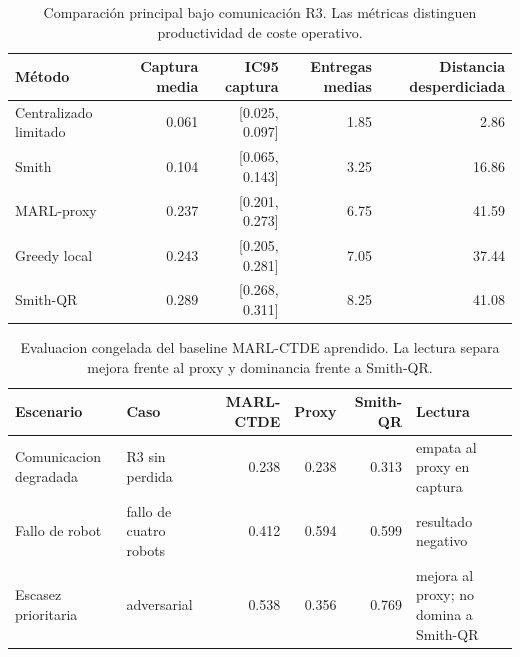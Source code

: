 \begin{table}[H]
\centering
\caption{Comparación principal bajo comunicación R3. Las métricas distinguen productividad de coste operativo.}
\label{tab:validation-suite-r3}
\small
\begin{tabularx}{\textwidth}{@{}>{\raggedright\arraybackslash}Xrrrr@{}}
\toprule
Método & Captura media & IC95 captura & Entregas medias & Distancia desperdiciada \\
\midrule
Centralizado limitado & 0.061 & [0.025, 0.097] & 1.85 & 2.86 \\
Smith & 0.104 & [0.065, 0.143] & 3.25 & 16.86 \\
MARL-proxy & 0.237 & [0.201, 0.273] & 6.75 & 41.59 \\
Greedy local & 0.243 & [0.205, 0.281] & 7.05 & 37.44 \\
Smith-QR & 0.289 & [0.268, 0.311] & 8.25 & 41.08 \\
\bottomrule
\end{tabularx}
\end{table}

\begin{table}[H]
\centering
\caption{Evaluacion congelada del baseline MARL-CTDE aprendido. La lectura separa mejora frente al proxy y dominancia frente a Smith-QR.}
\label{tab:validation-suite-marl-ctde}
\small
\begin{tabularx}{\textwidth}{@{}>{\raggedright\arraybackslash}p{}>{\raggedright\arraybackslash}p{}rrr>{\raggedright\arraybackslash}X@{}}
\toprule
Escenario & Caso & MARL-CTDE & Proxy & Smith-QR & Lectura \\
\midrule
Comunicacion degradada & R3 sin perdida & 0.238 & 0.238 & 0.313 & empata al proxy en captura \\
Fallo de robot & fallo de cuatro robots & 0.412 & 0.594 & 0.599 & resultado negativo \\
Escasez prioritaria & adversarial & 0.538 & 0.356 & 0.769 & mejora al proxy; no domina a Smith-QR \\
\bottomrule
\end{tabularx}
\end{table}

